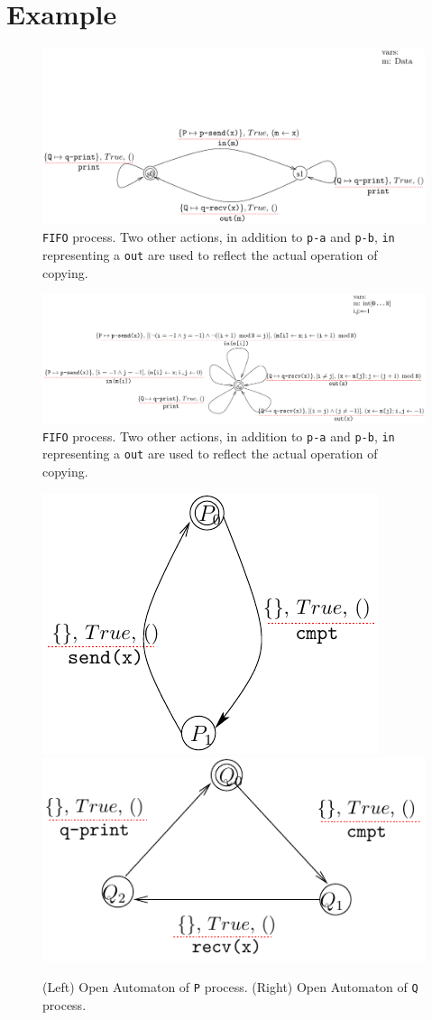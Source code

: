 \documentclass[runningheads]{llncs}
\begin{document}
\section{Example}

\begin{figure}[!tb]
 \centering
   \includegraphics[width=.90\textwidth]{Figures/FIFOpen2.pdf}
   \caption{\texttt{FIFO} process.  Two other actions,  in addition to  \texttt{p-a} and \texttt{p-b},  \texttt{in} representing a     \texttt{out} are used to reflect the actual operation of copying. \label{Fig:RefineOA}}
\end{figure}





\begin{figure}[!tb]
 \centering
   \includegraphics[width=1.25\textwidth]{Figures/FIFORing.pdf}
   \caption{\texttt{FIFO} process.  Two other actions,  in addition to  \texttt{p-a} and \texttt{p-b},  \texttt{in} representing a     \texttt{out} are used to reflect the actual operation of copying. \label{Fig:RefineOA}}
\end{figure}


\begin{figure}[h]
 \centering
   \includegraphics[width=.35\textwidth]{Figures/P-proc.pdf}\hfill 
   \includegraphics[width=.55\textwidth]{Figures/Q-proc.pdf}
   \caption{(Left) Open Automaton of \texttt{P} process.   (Right) Open Automaton of  \texttt{Q} process.\label{Fig:processes}}
\end{figure}
\end{document}
